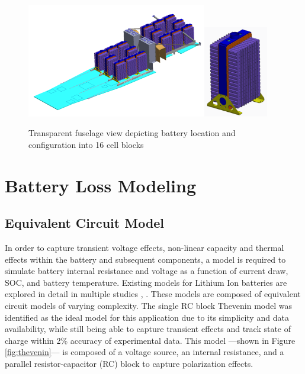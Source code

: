 \documentclass[]{aiaa-tc}%
\begin{document}
\begin{figure}[!htb]%
	\centering
	\includegraphics[width=0.7\textwidth]{figures/pallet.png}\includegraphics[width=0.25\textwidth]{figures/block.png}
	\caption{Transparent fuselage view depicting battery location and configuration into 16 cell blocks}
	\label{fig:pallet}
\end{figure}


\section{Battery Loss Modeling}

\subsection{Equivalent Circuit Model}

In order to capture transient voltage effects, non-linear capacity and thermal effects within the battery and subsequent components, a model is required to simulate battery internal resistance and voltage as a function of current draw, SOC, and battery temperature. 
Existing models for Lithium Ion batteries are explored in detail in multiple studies \cite{Huria}, \cite{Hongwen}. These models are composed of equivalent circuit models of varying complexity. The single RC block Thevenin model was identified as the ideal model for this application due to its simplicity and data availability, while still being able to capture transient effects and track state of charge within 2\% accuracy of experimental data. This model ---shown in Figure \ref{fig:thevenin}--- is composed of a voltage source, an internal resistance, and a parallel resistor-capacitor (RC) block to capture polarization effects. 
\end{document}
